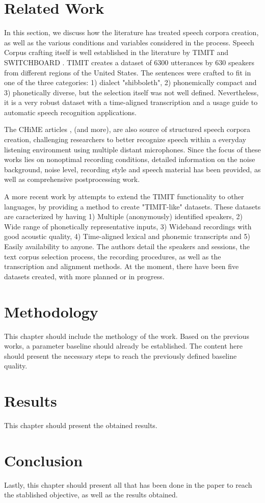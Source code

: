 	\chapter[Related Work]{Related Work}
	
	In this section, we discuss how the literature has treated speech corpora creation, as well as the various conditions and variables considered in the process. Speech Corpus crafting itself is well established in the literature by TIMIT \cite{Lamel1992timmit} and SWITCHBOARD \cite{godfrey1992switchboard}. TIMIT creates a dataset of 6300 utterances by 630 speakers from different regions of the United States. The sentences were crafted to fit in one of the three categories: 1) dialect "shibboleth", 2) phonemically compact and 3) phonetically diverse, but the selection itself was not well defined. Nevertheless, it is a very robust dataset with a time-aligned transcription and a usage guide to automatic speech recognition applications.
    
    The CHiME articles \cite{christensen2010chime} \cite{barker2013pascal}, \cite{barker2018fifth} (and more), are also source of structured speech corpora creation, challenging researchers to better recognize speech within a everyday listening environment using multiple distant microphones. Since the focus of these works lies on nonoptimal recording conditions, detailed information on the noise background, noise level, recording style and speech material has been provided, as well as comprehensive postprocessing work.
    
    A more recent work by \cite{chanchaochai2018globaltimit} attempts to extend the TIMIT functionality to other languages, by providing a method to create "TIMIT-like" datasets. These datasets are caracterized by having 1) Multiple (anonymously) identified speakers, 2) Wide range of phonetically representative inputs, 3) Wideband recordings with good acoustic quality, 4) Time-aligned lexical and phonemic transcripts and 5) Easily availability to anyone. The authors detail the speakers and sessions, the text corpus selection process, the recording procedures, as well as the transcription and alignment methods. At the moment, there have been five datasets created, with more planned or in progress.

	\chapter[Methodology]{Methodology}
	
    This chapter should include the methology of the work. Based on the previous works, a parameter baseline should already be established. The content here should present the necessary steps to reach the previously defined baseline quality.

    \chapter{Results}

    This chapter should present the obtained results.

	\chapter{Conclusion}

    Lastly, this chapter should present all that has been done in the paper to reach the stablished objective, as well as the results obtained.
